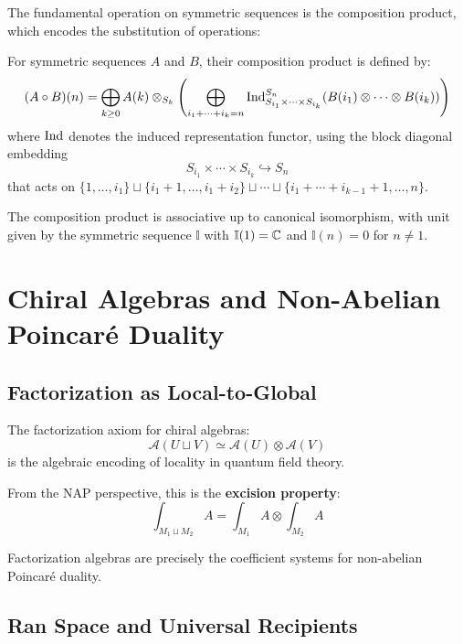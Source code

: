 The fundamental operation on symmetric sequences is the composition product, which encodes the substitution of operations:
 
\begin{definition}
For symmetric sequences $A$ and $B$, their composition product is defined by:
\[
(A \circ B)(n) = \bigoplus_{k \geq 0} A(k) \otimes_{S_k} \left( \bigoplus_{i_1 + \cdots + i_k = n} \operatorname{Ind}_{S_{i_1} \times \cdots \times S_{i_k}}^{S_n}(B(i_1) \otimes \cdots \otimes B(i_k)) \right)
\]
where $\operatorname{Ind}$ denotes the induced representation functor, using the block diagonal embedding 
\[
S_{i_1} \times \cdots \times S_{i_k} \hookrightarrow S_n
\]
that acts on $\{1, \ldots, i_1\} \sqcup \{i_1 + 1, \ldots, i_1 + i_2\} \sqcup \cdots \sqcup \{i_1 + \cdots + i_{k-1} + 1, \ldots, n\}$.
\end{definition}
 
The composition product is associative up to canonical isomorphism, with unit given by the symmetric sequence $\mathbb{I}$ with $\mathbb{I}(1) = \mathbb{C}$ and $\mathbb{I}(n) = 0$ for $n \neq 1$.
 
\section{Chiral Algebras and Non-Abelian Poincaré Duality}
\label{sec:chiral-NAP}

\subsection{Factorization as Local-to-Global}

\begin{principle}\label{princ:factorization-locality}
The factorization axiom for chiral algebras:
$$\mathcal{A}(U \sqcup V) \simeq \mathcal{A}(U) \otimes \mathcal{A}(V)$$
is the algebraic encoding of locality in quantum field theory.

From the NAP perspective, this is the \textbf{excision property}:
$$\int_{M_1 \sqcup M_2} A = \int_{M_1} A \otimes \int_{M_2} A$$

Factorization algebras are precisely the coefficient systems for non-abelian Poincaré duality.
\end{principle}

\subsection{Ran Space and Universal Recipients}

